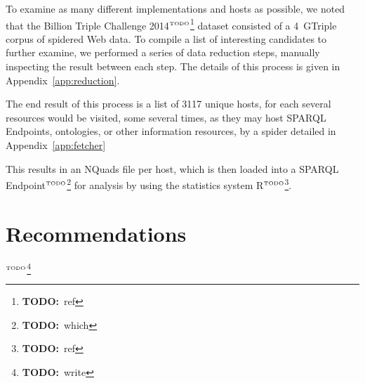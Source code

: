 \documentclass{article}
\newcommand{\todo}[1]{\ensuremath{^{\textrm{\tiny{TODO}\normalsize}}}\footnote{\textbf{TODO:}~#1}}
\begin{document}
To examine as many different implementations and hosts as possible, we
noted that the Billion Triple Challenge 2014\todo{ref} dataset
consisted of a 4~GTriple corpus of spidered Web data. To compile a
list of interesting candidates to further examine, we performed a
series of data reduction steps, manually inspecting the result between
each step. The details of this process is given in
Appendix~\ref{app:reduction}.

The end result of this process is a list of 3117 unique hosts, for
each several resources would be visited, some several times, as they
may host SPARQL Endpoints, ontologies, or other information resources,
by a spider detailed in Appendix~\ref{app:fetcher}

This results in an NQuads file per host, which is then loaded into a
SPARQL Endpoint\todo{which} for analysis by using the statistics
system R\todo{ref}.

\section{Recommendations}\todo{write}
\end{document}
